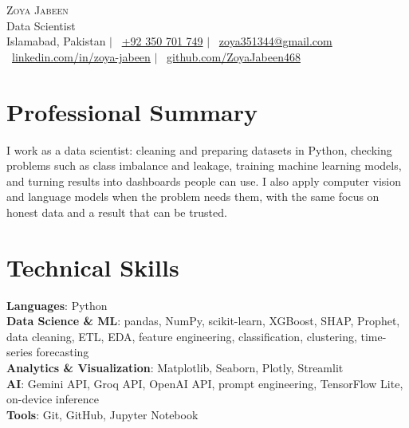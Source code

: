 \documentclass[a4paper,11pt]{article}
\begin{document}
\begin{center}
    {\Huge \scshape Zoya Jabeen} \\[3pt]
    {\large Data Scientist} \\[4pt]
    \small
    Islamabad, Pakistan $|$
    \faPhone~\href{tel:+92350701749}{+92 350 701 749} $|$
    \faEnvelope~\href{mailto:zoya351344@gmail.com}{zoya351344@gmail.com} \\[2pt]
    \faLinkedin~\href{https://www.linkedin.com/in/zoya-jabeen}{linkedin.com/in/zoya-jabeen} $|$
    \faGithub~\href{https://github.com/ZoyaJabeen468}{github.com/ZoyaJabeen468}
\end{center}

\section{Professional Summary}
\small{
I work as a data scientist: cleaning and preparing datasets in Python, checking problems such as class imbalance and leakage, training machine learning models, and turning results into dashboards people can use. I also apply computer vision and language models when the problem needs them, with the same focus on honest data and a result that can be trusted.
}

\section{Technical Skills}
 \begin{itemize}[leftmargin=0.12in, label={}, itemsep=-2pt]
    \small{\item{
     \textbf{Languages}{: Python} \\
     \textbf{Data Science \& ML}{: pandas, NumPy, scikit-learn, XGBoost, SHAP, Prophet, data cleaning, ETL, EDA, feature engineering, classification, clustering, time-series forecasting} \\
     \textbf{Analytics \& Visualization}{: Matplotlib, Seaborn, Plotly, Streamlit} \\
     \textbf{AI}{: Gemini API, Groq API, OpenAI API, prompt engineering, TensorFlow Lite, on-device inference} \\
     \textbf{Tools}{: Git, GitHub, Jupyter Notebook}
    }}
 \end{itemize}
\end{document}
